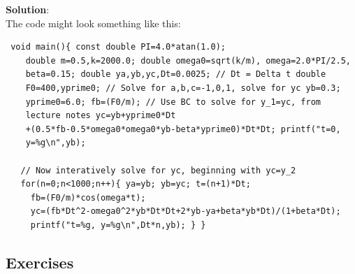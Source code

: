 {\bf Solution}:\\ The code might look something like this:
{\tt \begin{verbatim} void main(){ const double PI=4.0*atan(1.0);
    double m=0.5,k=2000.0; double omega0=sqrt(k/m), omega=2.0*PI/2.5,
    beta=0.15; double ya,yb,yc,Dt=0.0025; // Dt = Delta t double
    F0=400,yprime0; // Solve for a,b,c=-1,0,1, solve for yc yb=0.3;
    yprime0=6.0; fb=(F0/m); // Use BC to solve for y_1=yc, from
    lecture notes yc=yb+yprime0*Dt
    +(0.5*fb-0.5*omega0*omega0*yb-beta*yprime0)*Dt*Dt; printf("t=0,
    y=%g\n",yb);
   
   // Now interatively solve for yc, beginning with yc=y_2
   for(n=0;n<1000;n++){ ya=yb; yb=yc; t=(n+1)*Dt;
     fb=(F0/m)*cos(omega*t);
     yc=(fb*Dt^2-omega0^2*yb*Dt*Dt+2*yb-ya+beta*yb*Dt)/(1+beta*Dt);
     printf("t=%g, y=%g\n",Dt*n,yb); } }
\end{verbatim}}
\hrulefill

\subsection{Exercises}

